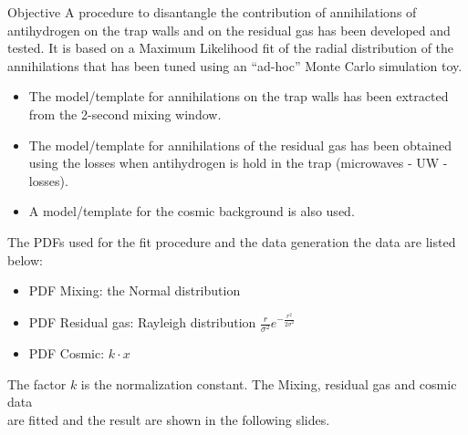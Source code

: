 \documentclass[9pt]{beamer}
\author[Adriano, Germano, Simone]{Adriano Del Vincio, Germano Bonomi,\\ Simone Stracka}
\title[Alpha 2]{Studying Annihilation Distributions \hrule}
\institute[]{University of Brescia, INFN Pisa}
\date{07/11/2023}
\begin{document}
\begin{frame}
\titlepage
\end{frame}


\begin{frame}{}

\begin{block}{Objective}
A procedure to disantangle the contribution of annihilations of antihydrogen on the trap walls and on the residual gas has been developed and tested.
It is based on a Maximum Likelihood fit of the radial distribution of the annihilations that has been tuned using an “ad-hoc” Monte Carlo simulation toy.
\end{block}

\begin{itemize}
\item The model/template for annihilations on the trap walls has been extracted from the 2-second mixing window.
\item The model/template for annihilations of the residual gas has been obtained using the losses when antihydrogen is hold in the trap (microwaves - UW - losses).
\item A model/template for the cosmic background is also used.
\end{itemize}


The PDFs used for the fit procedure and the data generation the data are listed below:
\begin{itemize}
\item PDF Mixing: the Normal distribution
\item PDF Residual gas: Rayleigh distribution $\frac{r}{\sigma^{2}} e^{-\frac{r^{2}}{2 \sigma^{2}}}$
\item PDF Cosmic: $k \cdot x$
\end{itemize}

The factor $k$ is the normalization constant. The Mixing, residual gas and cosmic data \\ are fitted and the result are shown in the following slides.
\end{frame}
\end{document}
